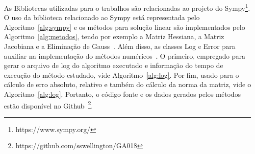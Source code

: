 



As Bibliotecas utilizadas para o trabalhos são relacionadas ao projeto do Sympy\footnote{https://www.sympy.org/}.
O uso da biblioteca relacionado ao Sympy está representada pelo Algoritmo~\ref{alg:sympy} e os métodos para solução linear são implementados pelo Algoritmo~\ref{alg:metodos}, tendo por exemplo a Matriz Hessiana, a Matriz Jacobiana e a Eliminação de Gauss~\cite{franco2006,gene2013}.
Além disso, as classes Log e Error para auxiliar na implementação do métodos numéricos~\cite{decio2003}.
O primeiro, empregado para gerar o arquivo de log do algoritmo executado e informação do tempo de execução do método estudado, vide Algoritmo~\ref{alg:log}.
Por fim, usado para o cálculo de erro absoluto, relativo e também do cálculo da norma da matriz, vide o Algoritmo~\ref{alg:log}.
Portanto, o código fonte e os dados gerados pelos métodos estão disponível no Github~\footnote{https://github.com/sswellington/GA018}.








